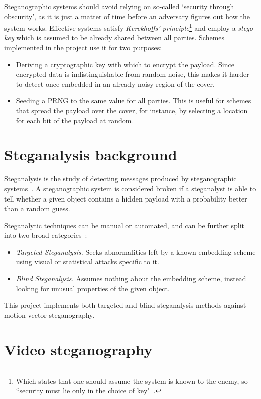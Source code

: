 \documentclass[12pt,british,twoside,notitlepage,usenames,dvipsnames,hypens,final]{report}
\numberwithin{equation}{section}
\numberwithin{figure}{section}
\begin{document}
Steganographic systems should avoid relying on so-called `security through obscurity', as it is just a matter of time before an adversary figures out how the system works. Effective systems satisfy \emph{Kerckhoffs' principle}\footnote{Which states that one should assume the system is known to the enemy, so ``security must lie only in the choice of key"~\cite{infohiding-survey}.} and employ a \emph{stego-key} which is assumed to be already shared between all parties. Schemes implemented in the project use it for two purposes:

\label{why-encrypt}
\begin{itemize}
\item Deriving a cryptographic key with which to encrypt the payload. Since encrypted data is indistinguishable from random noise, this makes it harder to detect once embedded in an already-noisy region of the cover.

\item Seeding a PRNG to the same value for all parties. This is useful for schemes that spread the payload over the cover, for instance, by selecting a location for each bit of the payload at random.
\end{itemize}
\section{Steganalysis background}

Steganalysis is the study of detecting messages produced by steganographic systems~\cite[p.~10]{fridrich}. A steganographic system is considered broken if a steganalyst is able to tell whether a given object contains a hidden payload with a probability better than a random guess.

Steganalytic techniques can be manual or automated, and can be further split into two broad categories~\cite{bateman}:
\begin{itemize}
\item \emph{Targeted Steganalysis.} Seeks abnormalities left by a known embedding scheme using visual or statistical attacks specific to it.
\item \emph{Blind Steganalysis.} Assumes nothing about the embedding scheme, instead looking for unusual properties of the given object. 
\end{itemize} 

This project implements both targeted and blind steganalysis methods against motion vector steganography.

\section{Video steganography}
\end{document}
